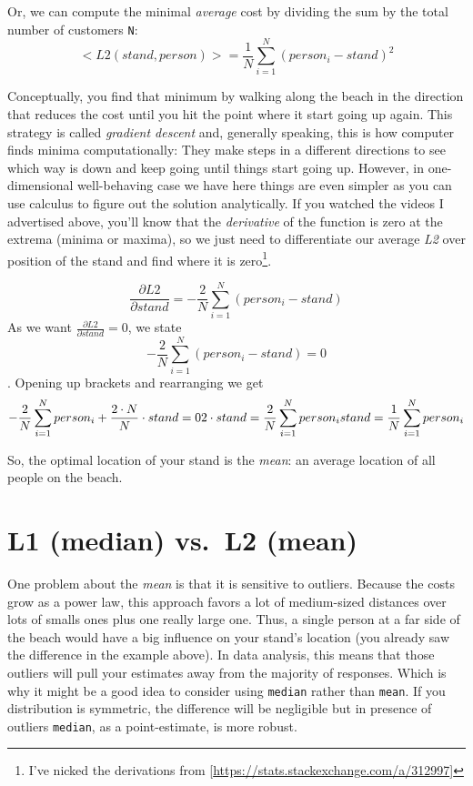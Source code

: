 \documentclass[
]{book}
\begin{document}
Or, we can compute the minimal \emph{average} cost by dividing the sum by the total number of customers \texttt{N}:
\[<L2(stand, person)> = \frac{1}{N}\sum_{i=1}^{N}{(person_i - stand)^2}\]

Conceptually, you find that minimum by walking along the beach in the direction that reduces the cost until you hit the point where it start going up again. This strategy is called \emph{gradient descent} and, generally speaking, this is how computer finds minima computationally: They make steps in a different directions to see which way is down and keep going until things start going up. However, in one-dimensional well-behaving case we have here things are even simpler as you can use calculus to figure out the solution analytically. If you watched the videos I advertised above, you'll know that the \emph{derivative} of the function is zero at the extrema (minima or maxima), so we just need to differentiate our average \emph{L2} over position of the stand and find where it is zero\footnote{I've nicked the derivations from {[}\url{https://stats.stackexchange.com/a/312997}{]}}.

\[\frac{\partial L2}{\partial stand} = -\frac{2}{N}\sum_{i=1}^{N}{(person_i - stand)}\]
As we want \(\frac{\partial L2}{\partial stand} = 0\), we state
\[-\frac{2}{N}\sum_{i=1}^{N}{(person_i - stand)} = 0\].
Opening up brackets and rearranging we get
\[-\frac{2}{N}\sum_{i=1}^{N}{person_i} + \frac{2\cdot N}{N}\cdot stand = 0\\
2\cdot stand = \frac{2}{N}\sum_{i=1}^{N}{person_i} \\
stand = \frac{1}{N}\sum_{i=1}^{N}{person_i}
\]

So, the optimal location of your stand is the \emph{mean}: an average location of all people on the beach.

\hypertarget{l1-median-vs.-l2-mean}{%
\section{L1 (median) vs.~L2 (mean)}\label{l1-median-vs.-l2-mean}}

One problem about the \emph{mean} is that it is sensitive to outliers. Because the costs grow as a power law, this approach favors a lot of medium-sized distances over lots of smalls ones plus one really large one. Thus, a single person at a far side of the beach would have a big influence on your stand's location (you already saw the difference in the example above). In data analysis, this means that those outliers will pull your estimates away from the majority of responses. Which is why it might be a good idea to consider using \texttt{median} rather than \texttt{mean}. If you distribution is symmetric, the difference will be negligible but in presence of outliers \texttt{median}, as a point-estimate, is more robust.
\end{document}
